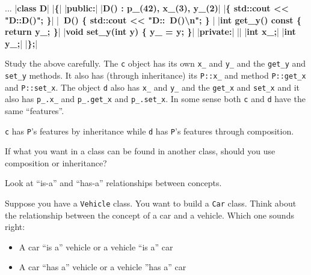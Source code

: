 \newpage\begin{consolethree}[escapeinside=||]
...
|\textbf{class D}|
|\textbf{\{}|
|\textbf{public:}|
        |\textbf{D() : p\_(42), x\_(3), y\_(2)}|
        |\textbf{\{ std::cout << "D::D()"; \}}|
        |\textbf{~D() \{ std::cout << "D::~D()\textbackslash n"; \}} |
        |\textbf{int get\_y() const \{ return y\_; \}}|
        |\textbf{void set\_y(int y) \{ y\_ = y; \}}|
|\textbf{private:}|
        || 
        |\textbf{int x\_;}|
        |\textbf{int y\_;}|
|\textbf{\};}|
\end{consolethree}

Study the above carefully. The \verb!c! object has its own \verb!x_!
and \verb!y_! and the \verb!get_y! and \verb!set_y! methods. It also
has (through inheritance) its \verb!P::x_! and method \verb!P::get_x!
and \verb!P::set_x!. The object \verb!d! also has \verb!x_! and
\verb!y_! and the \verb!get_x! and \verb!set_x! and it also has
\verb!p_.x_! and \verb!p_.get_x! and \verb!p_.set_x!. In some
sense both \verb!c! and \verb!d! have the same ``features''.

\verb!c! has \verb!P!'s features by inheritance while \verb!d! has
\verb!P!'s features through composition.

If what you want in a class can be found in another class, should you
use composition or inheritance?

Look at ``is-a'' and ``has-a'' relationships between concepts.

Suppose you have a \verb!Vehicle! class. You want to build a \verb!Car!
class. Think about the relationship between the concept of a car and a
vehicle. Which one sounds right:

\begin{itemize}
\item
  A car ``is a'' vehicle or a vehicle ``is a'' car
\item
  A car ``has a'' vehicle or a vehicle ''has a'' car
\end{itemize}

